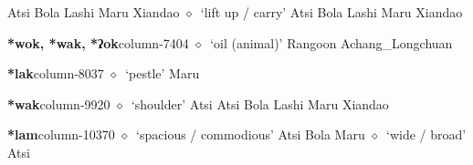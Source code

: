          Atsi 
\hspace{1ex}
         Bola 
\hspace{1ex}
         Lashi 
\hspace{1ex}
         Maru 
\hspace{1ex}
         Xiandao 
\hspace{1ex}
         $\diamond$~`lift up / carry'
         Atsi 
\hspace{1ex}
         Bola 
\hspace{1ex}
         Lashi 
\hspace{1ex}
         Maru 
\hspace{1ex}
         Xiandao 
  \item {\footnotesize \textbf{*wok, *wak, *ʔok}}{\tiny column-7404}
         $\diamond$~`oil (animal)'
         Rangoon 
\hspace{1ex}
         Achang\_Longchuan 
  \item {\footnotesize \textbf{*lak}}{\tiny column-8037}
         $\diamond$~`pestle'
         Maru 
  \item {\footnotesize \textbf{*wak}}{\tiny column-9920}
         $\diamond$~`shoulder'
         Atsi 
\hspace{1ex}
         Atsi 
\hspace{1ex}
         Bola 
\hspace{1ex}
         Lashi 
\hspace{1ex}
         Maru 
\hspace{1ex}
         Xiandao 
  \item {\footnotesize \textbf{*lam}}{\tiny column-10370}
         $\diamond$~`spacious / commodious'
         Atsi 
\hspace{1ex}
         Bola 
\hspace{1ex}
         Maru 
\hspace{1ex}
         $\diamond$~`wide / broad'
         Atsi 
